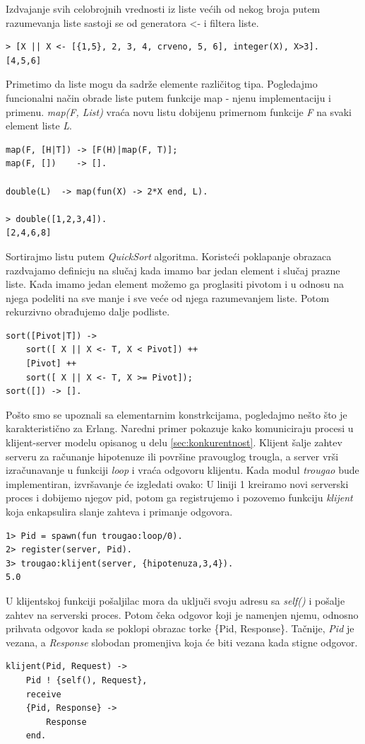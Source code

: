 \documentclass[a4paper]{article}
\begin{document}
Izdvajanje svih celobrojnih vrednosti iz liste većih od nekog broja putem razumevanja liste sastoji se od generatora <- i filtera liste.
\begin{verbatim}
> [X || X <- [{1,5}, 2, 3, 4, crveno, 5, 6], integer(X), X>3].
[4,5,6]
\end{verbatim}

Primetimo da liste mogu da sadrže elemente različitog tipa.
Pogledajmo funcionalni način obrade liste putem funkcije map - njenu implementaciju i primenu.
{\em map(F, List)} vraća novu listu dobijenu primernom funkcije {\em F} na svaki element liste {\em L}.
\begin{verbatim}
map(F, [H|T]) -> [F(H)|map(F, T)];
map(F, [])    -> [].

double(L)  -> map(fun(X) -> 2*X end, L).

> double([1,2,3,4]).
[2,4,6,8]
\end{verbatim}

Sortirajmo listu putem {\em QuickSort} algoritma. 
Koristeći poklapanje obrazaca razdvajamo definicju na slučaj kada imamo bar jedan 
element i slučaj prazne liste. Kada imamo jedan element možemo ga proglasiti pivotom i u odnosu na njega podeliti na sve manje i sve veće od njega razumevanjem liste.
Potom rekurzivno obrađujemo dalje podliste.
\begin{verbatim}
sort([Pivot|T]) ->
    sort([ X || X <- T, X < Pivot]) ++
    [Pivot] ++
    sort([ X || X <- T, X >= Pivot]);
sort([]) -> [].
\end{verbatim}

Pošto smo se upoznali sa elementarnim konstrkcijama, pogledajmo nešto što je 
karakteristično za Erlang. Naredni primer pokazuje kako komuniciraju procesi u klijent-server modelu opisanog u delu \ref{sec:konkurentnost}.
Klijent šalje zahtev serveru za računanje hipotenuze ili površine pravouglog trougla,
a server vrši izračunavanje u funkciji {\em loop} i vraća odgovoru klijentu. 
Kada modul {\em trougao} bude implementiran, izvršavanje će izgledati ovako: U liniji 1 kreiramo novi serverski proces i dobijemo njegov pid, 
potom ga registrujemo i pozovemo funkciju {\em klijent} koja enkapsulira slanje zahteva i primanje odgovora.
\begin{verbatim}
1> Pid = spawn(fun trougao:loop/0).
2> register(server, Pid).
3> trougao:klijent(server, {hipotenuza,3,4}).
5.0
\end{verbatim}

U klijentskoj funkciji pošaljilac mora da uključi svoju adresu sa {\em self()} i pošalje zahtev na serverski proces.
Potom čeka odgovor koji je namenjen njemu, odnosno prihvata odgovor kada se poklopi obrazac torke \{Pid, Response\}. Tačnije, {\em Pid} je vezana, a {\em Response} slobodan promenjiva koja će biti vezana kada stigne odgovor.
\begin{verbatim}
klijent(Pid, Request) ->
    Pid ! {self(), Request},
    receive
	{Pid, Response} ->
	    Response
    end.
\end{verbatim}
\end{document}
